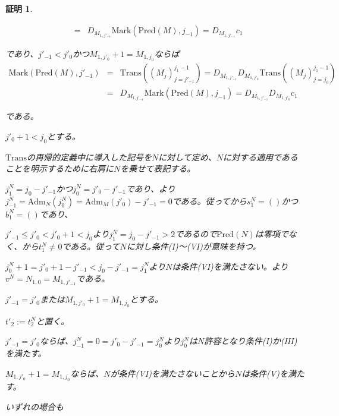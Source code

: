 \documentclass[dvipdfmx,uplatex]{jsarticle}
\theoremstyle{customnonumberbreakfortheorem}
\theoremstyle{customnonumberbreakforproof}
\newtheorem{hideableproof}{証明}
\begin{document}
\begin{hideableproof}
\begin{indented}
\begin{indented}
\begin{eqnarray*}
			& = & D_{M_{1,j'_{-1}}} \textrm{Mark}(\textrm{Pred}(M),j_{-1}) = D_{M_{1,j'_{-1}}} c_1
			\end{eqnarray*}
			\item であり、\(j'_{-1} < j'_0\)かつ\(M_{1,j'_0}+1 = M_{1,j_0}\)ならば
			\begin{eqnarray*}
			\textrm{Mark}(\textrm{Pred}(M),j'_{-1}) & = & \textrm{Trans}((M_j)_{j=j'_{-1}}^{j_1-1}) = D_{M_{1,j'_{-1}}} D_{M_{1,j'_0}} \textrm{Trans}((M_j)_{j=j_0}^{j_1-1}) \\
			& = & D_{M_{1,j'_{-1}}} \textrm{Mark}(\textrm{Pred}(M),j_{-1}) = D_{M_{1,j'_{-1}}} D_{M_{1,j'_0}} c_1
			\end{eqnarray*}
			\item である。
		\end{indented}
		\item
		\item \(j'_0+1 < j_0\)とする。
		\begin{indented}
			\item \(\textrm{Trans}\)の再帰的定義中に導入した記号を\(N\)に対して定め、\(N\)に対する適用であることを明示するために右肩に\(N\)を乗せて表記する。
			\item \(j_1^N = j_0-j'_{-1}\)かつ\(j_0^N = j'_0-j'_{-1}\)であり、より\(j_{-1}^N = \textrm{Adm}_N(j_0^N) = \textrm{Adm}_M(j'_0)-j'_{-1} = 0\)である。従ってから\(s_1^N = ()\)かつ\(b_1^N = ()\)であり、
			\item \(j'_{-1} \leq j'_0 < j'_0+1 < j_0\)より\(j_1^N = j_0-j'_{-1} > 2\)であるので\(\textrm{Pred}(N)\)は零項でなく、から\(t_1^N \neq 0\)である。従って\(N\)に対し条件(I)～(VI)が意味を持つ。
			\item \(j_0^N+1 = j'_0+1-j'_{-1} < j_0-j'_{-1} = j_1^N\)より\(N\)は条件(VI)を満たさない。より\(v^N = N_{1,0} = M_{1,j'_{-1}}\)である。
			\item \(j'_{-1} = j'_0\)または\(M_{1,j'_0}+1 = M_{1,j_0}\)とする。
			\begin{indented}
				\item \(t'_2 := t_2^N\)と置く。
				\item \(j'_{-1} = j'_0\)ならば、\(j_{-1}^N = 0 = j'_0-j'_{-1} = j_0^N\)より\(j_0^N\)は\(N\)許容となり条件(I)か(III)を満たす。
				\item \(M_{1,j'_0}+1 = M_{1,j_0}\)ならば、\(N\)が条件(VI)を満たさないことから\(N\)は条件(V)を満たす。
				\item いずれの場合も

\end{indented}
\end{indented}
\end{indented}
\end{hideableproof}
\end{document}
